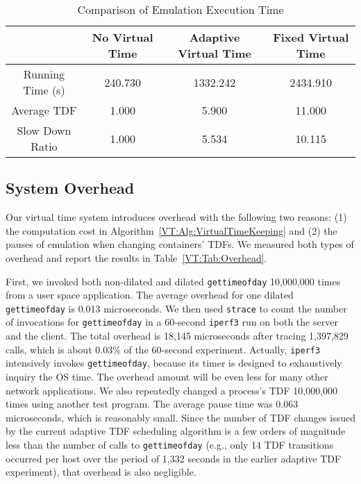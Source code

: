 \begin{table*}
    \centering
    \caption{Comparison of Emulation Execution Time}
    \begin{tabular}{c|c|c|c} 
        \hline
        & No Virtual Time & Adaptive Virtual Time & Fixed Virtual Time \\ 
        \hline
        \hline
        Running Time (s)  & 240.730 & 1332.242 & 2434.910 \\ 
        \hline
        Average TDF & 1.000 & 5.900 & 11.000 \\ 
        \hline
        Slow Down Ratio & 1.000 & 5.534 & 10.115 \\
        \hline
    \end{tabular}
    \label{VT:Tab:CompareRunTime}
\end{table*}

\subsection{System Overhead}
Our virtual time system introduces overhead with the following two reasons:
(1) the computation cost in Algorithm~\ref{VT:Alg:VirtualTimeKeeping} and
(2) the pauses of emulation when changing containers' TDFs.
We measured both types of overhead and report the results in Table~\ref{VT:Tab:Overhead}.

First, we invoked both non-dilated and dilated \texttt{gettimeofday} 10,000,000 times from a user space application.
The average overhead for one dilated \texttt{gettimeofday} is 0.013 microseconds.
We then used \texttt{strace} to count the number of invocations for \texttt{gettimeofday} in a 60-second \texttt{iperf3} run on both the server and the client.
The total overhead is 18,145 microseconds after tracing 1,397,829 calls, which is about 0.03\% of the 60-second experiment. 
Actually, \texttt{iperf3} intensively invokes \texttt{gettimeofday},
because its timer is designed to exhaustively inquiry the OS time.
The overhead amount will be even less for many other network applications.
We also repeatedly changed a process's TDF 10,000,000 times using another test program.
The average pause time was 0.063 microseconds, which is reasonably small.
Since the number of TDF changes issued by the current adaptive TDF scheduling algorithm
is a few orders of magnitude less than the number of calls to \texttt{gettimeofday}
(e.g., only 14 TDF transitions occurred per host over the period of 1,332 seconds in the earlier adaptive TDF experiment), that overhead is also negligible.

